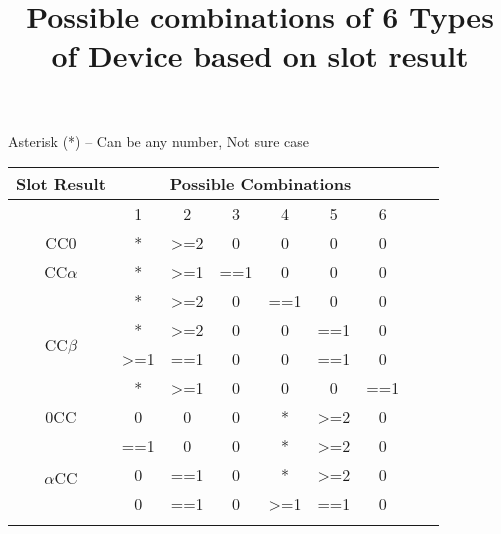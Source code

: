 \documentclass[fleqn]{article}
\begin{document}
\title{Possible combinations of 6 Types of Device based on slot result}

\maketitle{}

Asterisk (*) – Can be any number, Not sure case 

\begin {table} [h]
\centering
\begin{tabular}{|c|c|c|c|c|c|c|c|c|}
\hline
Slot Result                 & \multicolumn{6}{c|}{Possible Combinations}                                            \\ \hline
                            & 1                & 2                & 3   & 4                & 5                & 6   \\ \hline
CC0                         & *                & \textgreater{}=2 & 0   & 0                & 0                & 0   \\ \hline
CC$\alpha$                  & *                & \textgreater{}=1 & ==1 & 0                & 0                & 0   \\ \hline
\multirow{4}{*}{CC$\beta$}  & *                & \textgreater{}=2 & 0   & ==1              & 0                & 0   \\ \cline{2-7} 
                            & *                & \textgreater{}=2 & 0   & 0                & ==1              & 0   \\ \cline{2-7} 
                            & \textgreater{}=1 & ==1              & 0   & 0                & ==1              & 0   \\ \cline{2-7} 
                            & *                & \textgreater{}=1 & 0   & 0                & 0                & ==1 \\ \hline
0CC                         & 0                & 0                & 0   & *                & \textgreater{}=2 & 0   \\ \hline
\multirow{4}{*}{$\alpha$CC} & ==1              & 0                & 0   & *                & \textgreater{}=2 & 0   \\ \cline{2-7} 
                            & 0                & ==1              & 0   & *                & \textgreater{}=2 & 0   \\ \cline{2-7} 
                            & 0                & ==1              & 0   & \textgreater{}=1 & ==1              & 0   \\ \cline{2-7} 

\end{tabular}
\end{table}
\end{document}

